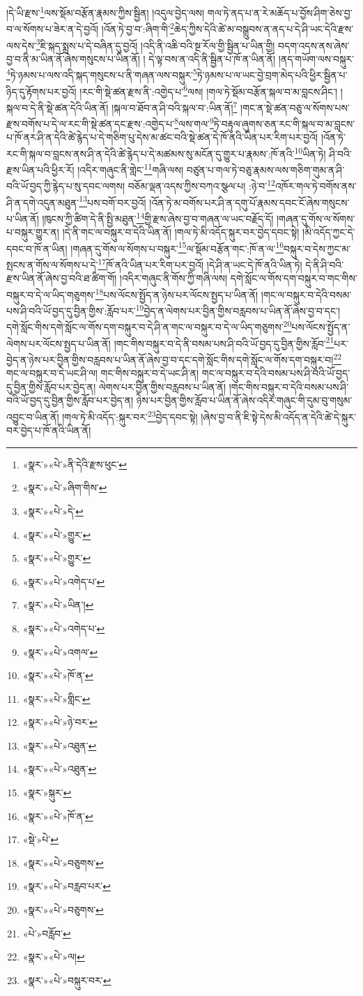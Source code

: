 །དེ་ཡི་རྫས་\footnote{«སྣར་»«པེ་»ནི་དེའི་རྫས་ཕུང་}ལས་སྡོམ་བརྩོན་རྣམས་ཀྱིས་སྦྱིན། །འདུལ་བྱེད་ལས། གལ་ཏེ་ནད་པ་ན་རེ་མཆོད་པ་བྱོས་ཤིག་ཅེས་བྱ་བ་ལ་སོགས་པ་ཟེར་ན་དེ་བྱའོ། །འོན་ཏེ་བྱ་བ་:ཞིག་གི་\footnote{«སྣར་»«པེ་»ཞིག་གིས་}ཆེད་ཀྱིས་དེའི་ཚེ་མ་བསྒྲུབས་ན་ནད་པ་དེ་ཤི་ཡང་དེའི་རྫས་ལས་དེས་\footnote{«སྣར་»«པེ་»དེ་}ཇི་སྐད་སྨྲས་པ་དེ་བཞིན་དུ་བྱའོ། །འདི་ནི་འཆི་བའི་སྔ་རོལ་གྱི་སྦྱིན་པ་ཡིན་གྱི། བདག་འདས་ནས་ཞེས་བྱ་བ་ནི་མ་ཡིན་ནོ་ཞེས་གསུངས་པ་ཡིན་ནོ། །
དེ་ལྟ་བས་ན་འདི་ནི་སྦྱིན་པ་ཁོ་ན་ཡིན་ནོ། །ནད་གཡོག་ལས་བསྐུར་\footnote{«སྣར་»«པེ་»གྱུར་}ཏེ་ཉམས་པ་ལས་འདི་སྐད་གསུངས་པ་ནི་གཞན་ལས་བསྐུར་\footnote{«སྣར་»«པེ་»གྱུར་}ཏེ་ཉམས་པ་ལ་ཡང་བྱེ་བྲག་མེད་པའི་ཕྱིར་སྦྱིན་པ་ཉིད་དུ་རྟོགས་པར་བྱའོ། །རང་གི་སྡེ་ཚན་རྫས་ནི་:འགྱེད་པ་\footnote{«སྣར་»«པེ་»འགེད་པ་}ལས། །གལ་ཏེ་སྡོམ་བརྩོན་སྐལ་བ་མ་བླངས་ཤིང་། །སྐལ་བ་དེ་ནི་སྡེ་ཚན་དེའི་ཡིན་ནོ། །སྐལ་བ་ཐོབ་ན་ཤི་བའི་སྐལ་བ་:ཡིན་ནོ།\footnote{«སྣར་»«པེ་»ཡིན་།} །གང་ན་སྡེ་ཚན་བཅུ་ལ་སོགས་པས་རྫས་བགོས་པ་དེ་ལ་རང་གི་སྡེ་ཚན་དང་རྫས་:འགྱེད་པ་\footnote{«སྣར་»«པེ་»འགེད་པ་}ལས་གལ་\footnote{«སྣར་»«པེ་»འགལ་}ཏེ་བརྟུལ་ཞུགས་ཅན་རང་གི་སྐལ་བ་མ་བླངས་པ་ཁོ་ནར་ཤི་ན་དེའི་ཚེ་རྙེད་པ་དེ་གཅིག་པུ་དེས་མ་ཚང་བའི་སྡེ་ཚན་དེ་ཁོ་ནའི་ཡིན་པར་རིག་པར་བྱའོ། །འོན་ཏེ་རང་གི་སྐལ་བ་བླངས་ནས་ཤི་ན་དེའི་ཚེ་རྙེད་པ་དེ་མཚམས་སུ་མངོན་དུ་གྱུར་པ་རྣམས་:ཁོ་ནའི་\footnote{«སྣར་»«པེ་»ཁོ་ན་}ཡིན་ཏེ། ཤི་བའི་རྫས་ཡིན་པའི་ཕྱིར་རོ། །འདིར་གཞུང་ནི་གླེང་\footnote{«སྣར་»«པེ་»གླིང་}གཞི་ལས། བཙུན་པ་གལ་ཏེ་བཅུ་རྣམས་ལས་གཅིག་གུམ་ན་ཤི་བའི་ཡོ་བྱད་ཀྱི་རྙེད་པ་སུ་དབང་ལགས། བཅོམ་ལྡན་འདས་ཀྱིས་བཀའ་སྩལ་པ། :ཉེ་བ་\footnote{«སྣར་»«པེ་»ཉེ་བར་}འཁོར་གལ་ཏེ་བགོས་ནས་ཤི་ན་དགེ་འདུན་མཐུན་\footnote{«སྣར་»«པེ་»འཐུན་}པས་བགོ་བར་བྱའོ། །འོན་ཏེ་མ་བགོས་པར་ཤི་ན་དགུ་པོ་རྣམས་དབང་ངོ་ཞེས་གསུངས་པ་ཡིན་ནོ། །ཁུངས་ཀྱི་ཚིག་དེ་ནི་སྤྱི་མཐུན་\footnote{«སྣར་»«པེ་»འཐུན་}གྱི་རྫས་ཞེས་བྱ་བ་གཞན་ལ་ཡང་བརྗོད་དོ། །གཞན་དུ་གོས་ལ་སོགས་པ་བསྐུར་གྱུར་ན། །དེ་ནི་གང་ལ་བསྐུར་བ་དེའི་ཡིན་ནོ། །གལ་ཏེ་མི་འདོད་སྐུར་བར་བྱེད་དབང་སྟེ། །མི་འདོད་ཀྱང་དེ་དབང་བ་ཁོ་ན་ཡིན། །གཞན་དུ་གོས་ལ་སོགས་པ་བསྐུར་\footnote{«སྣར་»སྐུར་}ལ་སྡོམ་བརྩོན་གང་:ཁོ་ན་ལ་\footnote{«སྣར་»«པེ་»ཁོ་ན་}བསྐུར་བ་དེས་ཀྱང་མ་སྤངས་ན་གོས་ལ་སོགས་པ་དེ་\footnote{«སྡེ་»པེ་}ཁོ་ནའི་ཡིན་པར་རིག་པར་བྱའོ། །དེ་ཤི་ན་ཡང་དེ་ཁོ་ནའི་ཡིན་ཏེ། དེ་ནི་ཤི་བའི་རྫས་ཡིན་ནོ་ཞེས་བྱ་བའི་ཐ་ཚིག་གོ། །འདིར་གཞུང་ནི་གོས་ཀྱི་གཞི་ལས། དགེ་སློང་ལ་གོས་དག་བསྐུར་བ་གང་གིས་བསྐུར་བ་དེ་ལ་ཡིད་གཅུགས་\footnote{«སྣར་»«པེ་»བཅུགས་}པས་ལོངས་སྤྱོད་ན་ཉེས་པར་ལོངས་སྤྱད་པ་ཡིན་ནོ། །གང་ལ་བསྐུར་བ་དེའི་བསམ་པས་ཤི་བའི་ཡོ་བྱད་དུ་བྱིན་གྱིས་:རློབ་པར་\footnote{«སྣར་»«པེ་»བརླབ་པར་}བྱེད་ན་ལེགས་པར་བྱིན་གྱིས་བརླབས་པ་ཡིན་ནོ་ཞེས་བྱ་བ་དང་། དགེ་སློང་གིས་དགེ་སློང་ལ་གོས་དག་བསྐུར་བ་དེ་ཤི་ན་གང་ལ་བསྐུར་བ་དེ་ལ་ཡིད་གཅུགས་\footnote{«སྣར་»«པེ་»བཅུགས་}པས་ལོངས་སྤྱོད་ན་ལེགས་པར་ལོངས་སྤྱད་པ་ཡིན་ནོ། །གང་གིས་བསྐུར་བ་དེ་ནི་བསམ་པས་ཤི་བའི་ཡོ་བྱད་དུ་བྱིན་གྱིས་རློབ་\footnote{«པེ་»བརློབ་}པར་བྱེད་ན་ཉེས་པར་བྱིན་གྱིས་བརླབས་པ་ཡིན་ནོ་ཞེས་བྱ་བ་དང་དགེ་སློང་གིས་དགེ་སློང་ལ་གོས་དག་བསྐུར་བ།\footnote{«སྣར་»«པེ་»ལ།} གང་ལ་བསྐུར་བ་དེ་ཡང་ཤི་ལ། གང་གིས་བསྐུར་བ་དེ་ཡང་ཤི་ན། གང་ལ་བསྐུར་བ་དེའི་བསམ་པས་ཤི་བའི་ཡོ་བྱད་དུ་བྱིན་གྱིས་རློབ་པར་བྱེད་ན། ལེགས་པར་བྱིན་གྱིས་བརླབས་པ་ཡིན་ནོ། །གང་གིས་བསྐུར་བ་དེའི་བསམ་པས་ཤི་བའི་ཡོ་བྱད་དུ་བྱིན་གྱིས་རློབ་པར་བྱེད་ན། ཉེས་པར་བྱིན་གྱིས་རློབ་པ་ཡིན་ནོ་ཞེས་འདིར་གཞུང་གི་དུམ་བུ་གསུམ་འབྱུང་བ་ཡིན་ནོ། །གལ་ཏེ་མི་འདོད་:སྐུར་བར་\footnote{«སྣར་»«པེ་»བསྐུར་བར་}བྱེད་དབང་སྟེ། །ཞེས་བྱ་བ་ནི་ཇི་སྟེ་དེས་མི་འདོད་ན་དེའི་ཚེ་དེ་སྐུར་བར་བྱེད་པ་ཁོ་ནའི་ཡིན་ནོ། 